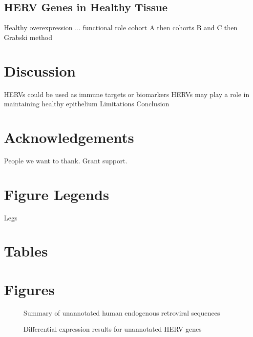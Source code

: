 \documentclass[11pt,letterpaper]{article}
\begin{document}
\subsection*{HERV Genes in Healthy Tissue}

Healthy overexpression ... functional role
cohort A
then cohorts B and C
then Grabski method

\section*{Discussion}

HERVs could be used as immune targets or biomarkers
HERVs may play a role in maintaining healthy epithelium
Limitations
Conclusion

\newpage
\section*{Acknowledgements}

People we want to thank. Grant support.

\newpage



\newpage
\section*{Figure Legends}

Legs

\newpage
\section*{Tables}



\FloatBarrier
\newpage
\section*{Figures}

\begin{figure}[ht]
  \caption{Summary of unannotated human endogenous retroviral sequences}
  \label{fig:pre_sum}
\end{figure}

\begin{figure}[ht]
  \caption{Differential expression results for unannotated HERV genes}
  \label{fig:dge_res}
\end{figure}
\end{document}
